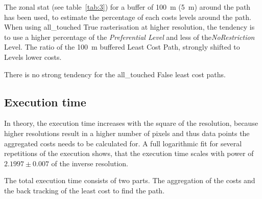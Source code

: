 The zonal stat (see table~\ref{tab:3}) for a buffer of 100~m (5~m) around the path has been used, to estimate the
percentage of each costs levels around the path.
When using all\_touched True rasterisation at higher resolution, the tendency is to use a higher percentage of the
\textit{Preferential Level} and less of the\textit{NoRestriction} Level.
The ratio of the 100~m buffered Least Cost Path, strongly shifted  to Levels lower costs.

There is no strong tendency for the all\_touched False least cost paths.

\subsection{Execution time}\label{subsec:execution-time}

In theory, the execution time increases with the square of the resolution, because higher resolutions result in a higher number of pixels and thus data points the aggregated costs needs to be calculated for. 
A full logarithmic fit for several repetitions of the execution shows, that the execution time scales with power of $2.1997  \pm 0.007$ of the inverse resolution. 

The total execution time consists of two parts. 
The aggregation of the costs and the back tracking of the least cost to find the path.

\setlength{\tabcolsep}{10pt}

